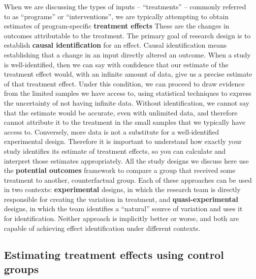 When we are discussing the types of inputs -- ``treatments'' -- commonly referred to as
``programs'' or ``interventions'', we are typically attempting to obtain estimates
of program-specific \textbf{treatment effects}
These are the changes in outcomes attributable to the treatment.\cite{abadie2018econometric}
The primary goal of research design is to establish \textbf{causal identification} for an effect.
Causal identification means establishing that a change in an input directly altered an outcome.
When a study is well-identified, then we can say with confidence
that our estimate of the treatment effect would,
with an infinite amount of data,
give us a precise estimate of that treatment effect.
Under this condition, we can proceed to draw evidence from the limited samples we have access to,
using statistical techniques to express the uncertainty of not having infinite data.
Without identification, we cannot say that the estimate would be accurate,
even with unlimited data, and therefore cannot attribute it to the treatment
in the small samples that we typically have access to.
Conversely, more data is not a substitute for a well-identified experimental design.
Therefore it is important to understand how exactly your study
identifies its estimate of treatment effects,
so you can calculate and interpret those estimates appropriately.
All the study designs we discuss here use the \textbf{potential outcomes} framework
to compare a group that received some treatment to another, counterfactual group.
Each of these approaches can be used in two contexts:
\textbf{experimental} designs, in which the research team
is directly responsible for creating the variation in treatment,
and \textbf{quasi-experimental} designs, in which the team
identifies a ``natural'' source of variation and uses it for identification.
Neither approach is implicitly better or worse,
and both are capable of achieving effect identification under different contexts.

\subsection{Estimating treatment effects using control groups}

